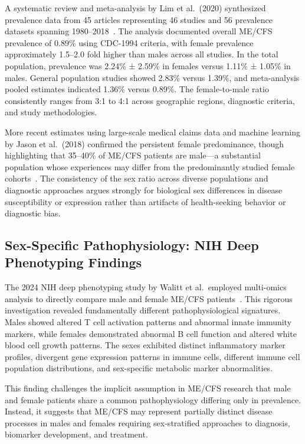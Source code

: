 \begin{achievement}
\label{ach:female-prevalence}
A systematic review and meta-analysis by Lim et al.\ (2020) synthesized prevalence data from 45 articles representing 46 studies and 56 prevalence datasets spanning 1980--2018~\cite{lim2020prevalence}. The analysis documented overall ME/CFS prevalence of 0.89\% using CDC-1994 criteria, with female prevalence approximately 1.5--2.0 fold higher than males across all studies. In the total population, prevalence was 2.24\% ± 2.59\% in females versus 1.11\% ± 1.05\% in males. General population studies showed 2.83\% versus 1.39\%, and meta-analysis pooled estimates indicated 1.36\% versus 0.89\%. The female-to-male ratio consistently ranges from 3:1 to 4:1 across geographic regions, diagnostic criteria, and study methodologies.
\end{achievement}

More recent estimates using large-scale medical claims data and machine learning by Jason et al.\ (2018) confirmed the persistent female predominance, though highlighting that 35--40\% of ME/CFS patients are male---a substantial population whose experiences may differ from the predominantly studied female cohorts~\cite{jason2018prevalence}. The consistency of the sex ratio across diverse populations and diagnostic approaches argues strongly for biological sex differences in disease susceptibility or expression rather than artifacts of health-seeking behavior or diagnostic bias.

\subsection{Sex-Specific Pathophysiology: NIH Deep Phenotyping Findings}

\begin{achievement}
\label{ach:sex-specific-pathophys}
The 2024 NIH deep phenotyping study by Walitt et al.\ employed multi-omics analysis to directly compare male and female ME/CFS patients~\cite{walitt2024deep}. This rigorous investigation revealed fundamentally different pathophysiological signatures. Males showed altered T cell activation patterns and abnormal innate immunity markers, while females demonstrated abnormal B cell function and altered white blood cell growth patterns. The sexes exhibited distinct inflammatory marker profiles, divergent gene expression patterns in immune cells, different immune cell population distributions, and sex-specific metabolic marker abnormalities.

This finding challenges the implicit assumption in ME/CFS research that male and female patients share a common pathophysiology differing only in prevalence. Instead, it suggests that ME/CFS may represent partially distinct disease processes in males and females requiring sex-stratified approaches to diagnosis, biomarker development, and treatment.
\end{achievement}

